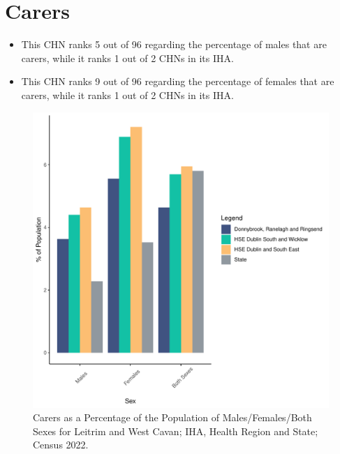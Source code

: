 \documentclass{article}
\begin{document}
\section{Carers}\label{sect:Carers}
\begin{itemize}
\item This CHN ranks  5 out of 96 regarding the percentage of males that are carers, while it ranks   1 out of 2 CHNs in its IHA.
\item This CHN ranks  9 out of 96 regarding the percentage of females that are carers, while it ranks   1 out of 2 CHNs in its IHA.
\end{itemize}
\begin{figure}[H]
	\centering
	\includegraphics[width = 150mm]{../figures/CareED.pdf}
	\caption{Carers as a Percentage of the Population of Males/Females/Both Sexes for Leitrim and West Cavan; IHA, Health Region and State; Census 2022.}
	\label{fig:2ae19629-1a6a-13a3-e055-000000000001}
	\end{figure}
\end{document}
